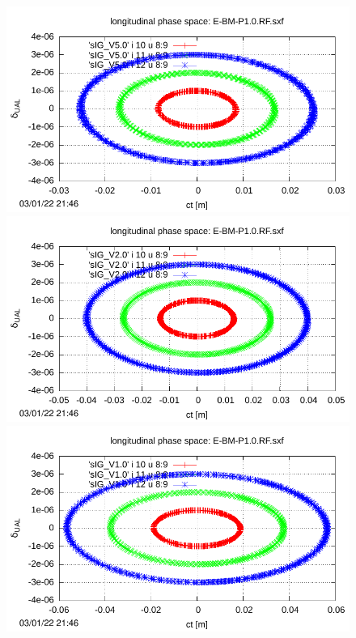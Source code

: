 \documentclass[]{article}
\begin{document}
%
\begin{figure}[h]
\begin{minipage}[b]{0.45\linewidth}
\centering
\includegraphics[scale=0.6]{pdf/delta_vs_ct_V5p0.pdf}
\end{minipage}
%
\begin{minipage}[b]{0.45\linewidth}
\centering
\includegraphics[scale=0.6]{pdf/delta_vs_ct_V2p0.pdf}
\end{minipage}
%
%
\begin{minipage}[b]{0.45\linewidth}
\centering
\includegraphics[scale=0.6]{pdf/delta_vs_ct_V1p0.pdf}

\end{minipage}
\end{figure}
\end{document}
